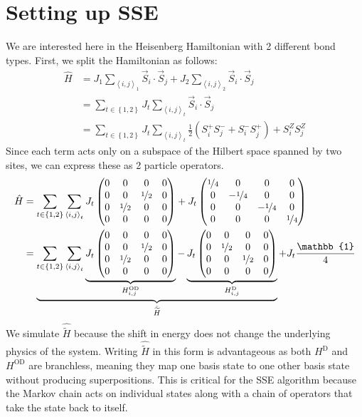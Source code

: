 \documentclass[ngerman]{scrartcl}
\begin{document}
\section*{Setting up SSE}
We are interested here in the Heisenberg Hamiltonian with 2 different bond types. First, we split the Hamiltonian as follows:
\begin{align*}
    \hat{H}&=J_1\sum_{\left<i,j\right>_1}\Vec{S}_i\cdot\Vec{S}_j + J_2\sum_{\left<i,j\right>_2}\Vec{S}_i\cdot\Vec{S}_j\\
    &=\sum_{t\in \left\{1,2\right\}}J_t\sum_{\left<i,j\right>_t}\vec{S}_i\cdot \vec{S}_j\\
    &=\sum_{t\in \left\{1,2\right\}}J_t\sum_{\left<i,j\right>_t} \frac{1}{2}\left(S_i^+S_j^-+S_i^-S_j^+\right)+S_i^ZS_j^Z
\end{align*}
Since each term acts only on a subspace of the Hilbert space spanned by two sites, we can express these as 2 particle operators. 
\begin{align*}
    \hat{H}&=\sum_{t\in \left\{1,2\right\}}\sum_{\left<i,j\right>_t} J_t\begin{pmatrix}
        0 & 0 & 0 & 0\\
        0 & 0 & \nicefrac{1}{2} & 0 \\
        0 & \nicefrac{1}{2} & 0 & 0\\
        0 & 0 & 0 & 0
    \end{pmatrix}+
    J_t\begin{pmatrix}
        \nicefrac{1}{4} & 0 & 0 & 0\\
        0 & -\nicefrac{1}{4} & 0 & 0 \\
        0 & 0 & -\nicefrac{1}{4} & 0\\
        0 & 0 & 0 & \nicefrac{1}{4}
    \end{pmatrix}\\
    &=\underbrace{\sum_{t\in \left\{1,2\right\}}\sum_{\left<i,j\right>_t} \underbrace{J_t\begin{pmatrix}
        0 & 0 & 0 & 0\\
        0 & 0 & \nicefrac{1}{2} & 0 \\
        0 & \nicefrac{1}{2} & 0 & 0\\
        0 & 0 & 0 & 0
    \end{pmatrix}}_{H^\text{OD}_{i,j}}-
    \underbrace{J_t\begin{pmatrix}
        0 & 0 & 0 & 0\\
        0 & \nicefrac{1}{2} & 0 & 0 \\
        0 & 0 & \nicefrac{1}{2} & 0\\
        0 & 0 & 0 & 0
    \end{pmatrix}}_{H^\text{D}_{i,j}}}_{\hat{\widetilde{H}}} +J_t \frac{\mathbb{1}}{4}
\end{align*}
We simulate $\hat{\widetilde{H}}$ because the shift in energy does not change the underlying physics of the system. Writing $\hat{\widetilde{H}}$ in this form is advantageous as both $H^\text{D}$ and $H^\text{OD}$ are branchless, meaning they map one basis state to one other basis state without producing superpositions. This is critical for the SSE algorithm because the Markov chain acts on individual states along with a chain of operators that take the state back to itself.
\end{document}
